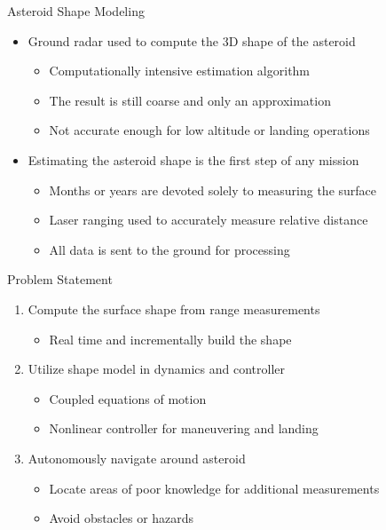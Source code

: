 \documentclass[11pt,professionalfonts,aspectratio=169]{beamer}
\begin{document}
\begin{frame}{Asteroid Shape Modeling}
    \begin{itemize}
        \item<1-> Ground radar used to compute the 3D shape of the asteroid
        \begin{itemize}
            \item Computationally intensive estimation algorithm 
            \item The result is still coarse and only an approximation
            \item Not accurate enough for low altitude or landing operations
        \end{itemize}
    \item<2-> Estimating the asteroid shape is the first step of any mission
    \begin{itemize}
        \item Months or years are devoted solely to measuring the surface
        \item Laser ranging used to accurately measure relative distance
        \item All data is sent to the ground for processing
    \end{itemize}
    \end{itemize}
    
\end{frame}

\begin{frame}{Problem Statement}
\begin{enumerate}
    \item<1-> Compute the surface shape from range measurements
        \begin{itemize}
            \item Real time and incrementally build the shape
        \end{itemize}
    \item<2-> Utilize shape model in dynamics and controller
        \begin{itemize}
            \item Coupled equations of motion 
            \item Nonlinear controller for maneuvering and landing
        \end{itemize}
    \item<3-> Autonomously navigate around asteroid 
        \begin{itemize}
            \item Locate areas of poor knowledge for additional measurements
            \item Avoid obstacles or hazards
        \end{itemize}
\end{enumerate}
\end{frame}
\end{document}
